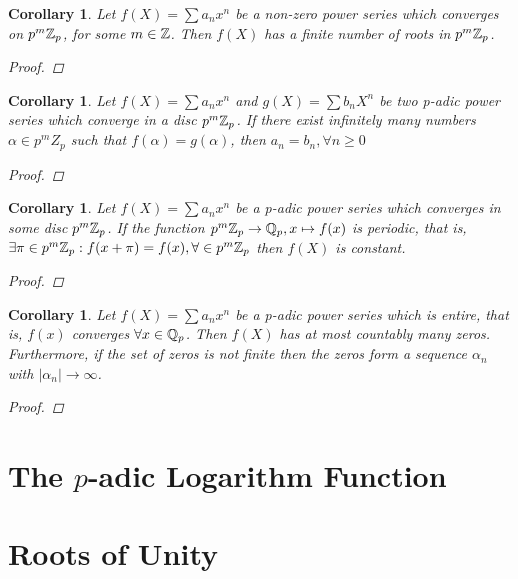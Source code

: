 \documentclass[a4paper]{article}
\theoremstyle{plain}
\newtheorem{Cor}[thm]{Corollary}
\theoremstyle{definition}
\begin{document}
\begin{Cor}
  Let $f(X) = \sum a_{n}x^{n}$ be a non-zero power series which converges on $p^{m}\Bbb Z_{p}$, for some $m \in \Bbb Z$. Then $f(X)$ has a finite number of roots in $p^{m} \Bbb Z_{p}$.
  \begin{proof}

  \end{proof}
\end{Cor}
\begin{Cor}
  Let $f(X) = \sum a_{n}x^{n}$ and $g(X) = \sum b_{n}X^{n}$ be two p-adic power series which converge in a disc $p^{m}\Bbb Z_{p}$. If there exist infinitely many numbers $\alpha \in p^{m}Z_{p}$ such that $f(\alpha) = g(\alpha)$, then $a_{n} = b_{n}, \forall n \geq 0$

  \begin{proof}

  \end{proof}
\end{Cor}
\begin{Cor}
  Let $f(X) = \sum a_{n}x^{n}$ be a p-adic power series which converges in some disc $p^{m}\Bbb Z_{p}$. If the function $p^{m}\Bbb Z_{p} \to \Bbb Q_{p}, x \mapsto f(x)$ is periodic, that is, $\exists \pi \in p^{m}\Bbb Z_{p} : f(x + \pi) = f(x), \forall \in p^{m}\Bbb Z_{p}$ then $f(X)$ is constant.

  \begin{proof}

  \end{proof}
\end{Cor}
\begin{Cor}
  Let $f(X) = \sum a_{n}x^{n}$ be a p-adic power series which is entire, that is, $f(x)$ converges $\forall x \in \Bbb Q_{p}$. Then $f(X)$ has at most countably many zeros. Furthermore, if the set of zeros is not finite then the zeros form a sequence $\alpha_{n}$ with $|\alpha_{n}| \to \infty$.

  \begin{proof}

  \end{proof}
\end{Cor}
\section{The $p$-adic Logarithm Function}
\section{Roots of Unity}
\end{document}
